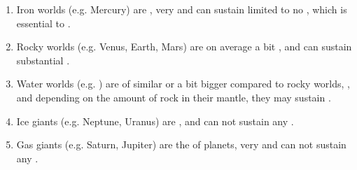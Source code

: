 \documentclass[letterpaper,10pt,english]{sphinxmanual}
\begin{document}
\begin{enumerate}
%
\item {} 
\sphinxAtStartPar
Iron worlds (e.g. Mercury) are {\hyperref[\detokenize{quantities/geometric/radius:id1}]{}}, very {\hyperref[\detokenize{quantities/material/density:id1}]{}} and can sustain limited to no {\hyperref[\detokenize{quantities/surface/internal_heating/tectonic_activity:id1}]{}}, which is essential to {\hyperref[\detokenize{quantities/habitability/habitability:id1}]{}}.

\item {} 
\sphinxAtStartPar
Rocky worlds (e.g. Venus, Earth, Mars) are on average a bit {\hyperref[\detokenize{quantities/geometric/radius:id1}]{}}, {\hyperref[\detokenize{quantities/material/density:id1}]{}} and can sustain substantial {\hyperref[\detokenize{quantities/surface/internal_heating/tectonic_activity:id1}]{}}.

\item {} 
\sphinxAtStartPar
Water worlds (e.g. ) are of similar {\hyperref[\detokenize{quantities/geometric/radius:id1}]{}} or a bit bigger compared to rocky worlds, {\hyperref[\detokenize{quantities/material/density:id1}]{}}, and depending on the amount of rock in their mantle, they may sustain {\hyperref[\detokenize{quantities/surface/internal_heating/tectonic_activity:id1}]{}}.

\item {} 
\sphinxAtStartPar
Ice giants (e.g. Neptune, Uranus) are {\hyperref[\detokenize{quantities/geometric/radius:id1}]{}}, {\hyperref[\detokenize{quantities/material/density:id1}]{}} and can not sustain any {\hyperref[\detokenize{quantities/surface/internal_heating/tectonic_activity:id1}]{}}.

\item {} 
\sphinxAtStartPar
Gas giants (e.g. Saturn, Jupiter) are the {\hyperref[\detokenize{quantities/geometric/radius:id1}]{}} of planets, very {\hyperref[\detokenize{quantities/material/density:id1}]{}} and can not sustain any {\hyperref[\detokenize{quantities/surface/internal_heating/tectonic_activity:id1}]{}}.

\end{enumerate}
\end{document}
